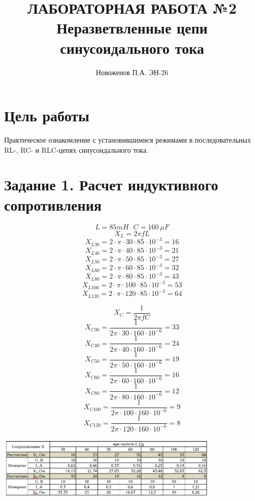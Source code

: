 \documentclass[14pt, a4paper]{article}
\title{ЛАБОРАТОРНАЯ РАБОТА №2
Неразветвленные цепи синусоидального тока
}
\author{Новоженов П.А. ЭН-26}
\date{}
\begin{document}
    \maketitle

    \thispagestyle{empty}

    \clearpage

    \section*{Цель работы}
        Практическое ознакомление с установившимися режимами в
        последовательных RL-, RC- и RLC-цепях синусоидального тока.

    
    \section*{Задание 1. Расчет индуктивного сопротивления}


        $$L = 85 mH \ \ \ C = 160 \ \mu F$$
        $$X_L = 2\pi f L$$
        $$X_{L30} = 2\cdot \pi \cdot 30 \cdot 85 \cdot 10^{-3} = 16$$
        $$X_{L40} = 2\cdot \pi \cdot 40 \cdot 85 \cdot 10^{-3} = 21$$
        $$X_{L50} = 2\cdot \pi \cdot 50 \cdot 85 \cdot 10^{-3} = 27$$
        $$X_{L60} = 2\cdot \pi \cdot 60 \cdot 85 \cdot 10^{-3} = 32$$
        $$X_{L80} = 2\cdot \pi \cdot 80 \cdot 85 \cdot 10^{-3} = 43$$
        $$X_{L100} = 2\cdot \pi \cdot 100 \cdot 85 \cdot 10^{-3} = 53$$
        $$X_{L120} = 2\cdot \pi \cdot 120 \cdot 85 \cdot 10^{-3} = 64$$
 
        $$X_{C} = \frac{1}{2\pi f C}$$ 
        $$X_{C30} = \frac{1}{2\pi \cdot 30 \cdot 160 \cdot 10^{-6}} =  33$$  
        $$X_{C40} = \frac{1}{2\pi \cdot 40 \cdot 160 \cdot 10^{-6}} = 24$$
        $$X_{C50} = \frac{1}{2\pi \cdot 50 \cdot 160 \cdot 10^{-6}} = 19$$
        $$X_{C60} = \frac{1}{2\pi \cdot 60 \cdot 160 \cdot 10^{-6}} = 16$$
        $$X_{C80} = \frac{1}{2\pi \cdot 80 \cdot 160 \cdot 10^{-6}} = 12$$
        $$X_{C100} = \frac{1}{2\pi \cdot 100 \cdot 160 \cdot 10^{-6}} = 9$$
        $$X_{C120} = \frac{1}{2\pi \cdot 120 \cdot 160 \cdot 10^{-6}} = 8$$

        {
            \includegraphics[width=0.8\textwidth]{Table.jpg}
            \centering
        }
\end{document}
